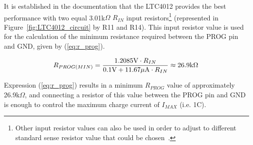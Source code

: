 It is established in the documentation that the LTC4012 provides the best performance with two equal 3.01k$\Omega$ $R_{IN}$ input resistors\footnote[9]{Other input resistor values can also be used in order to adjust to different standard sense resistor value that could be chosen~\cite{LTC4012}.} (represented in Figure~\ref{fig:LTC4012_circuit} by R11 and R14). This input resistor value is used for the calculation of the minimum resistance required between the PROG pin and \gls{GND}, given by (\ref{eq:r_prog}).

\begin{equation}\label{eq:r_prog}
    R_{PROG (MIN)}=\frac{1.2085 \textrm{V} \cdot R_{IN}}{0.1 \textrm{V} + 11.67 \mu \textrm{A} \cdot R_{IN}} \approx 26.9 \textrm{k}\Omega \,\medskip
\end{equation}

\noindent Expression (\ref{eq:r_prog}) results in a minimum $R_{PROG}$ value of approximately 26.9k$\Omega$, and connecting a resistor of this value between the PROG pin and GND is enough to control the maximum charge current of $I_{MAX}$ (i.e. 1C).


